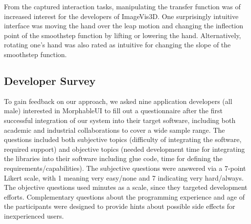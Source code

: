 \documentclass[twoside,twocolumn,10pt]{article}
\begin{document}
From the captured interaction tasks, manipulating the transfer function was of increased interest for the developers of ImageVis3D. One surprisingly intuitive interface was moving the hand over the leap motion and changing the inflection point of the smoothstep function by lifting or lowering the hand. Alternatively, rotating one's hand was also rated as intuitive for changing the slope of the smoothstep function.


\subsection{Developer Survey}
\label{sec:survey}

To gain feedback on our approach, we asked nine application developers (all male) interested in MorphableUI to fill out a questionnaire after the first successful integration of our system into their target software, including both academic and industrial collaborations to cover a wide sample range. The questions included both subjective topics (difficulty of integrating the software, required support) and objective topics (needed development time for integrating the libraries into their software including glue code, time for defining the requirements/capabilities). The subjective questions were answered via a 7-point Likert scale, with 1 meaning very easy/none and 7 indicating very hard/always. The objective questions used minutes as a scale, since they targeted development efforts. Complementary questions about the programming experience and age of the participants were designed to provide hints about possible side effects for inexperienced users.
\end{document}
